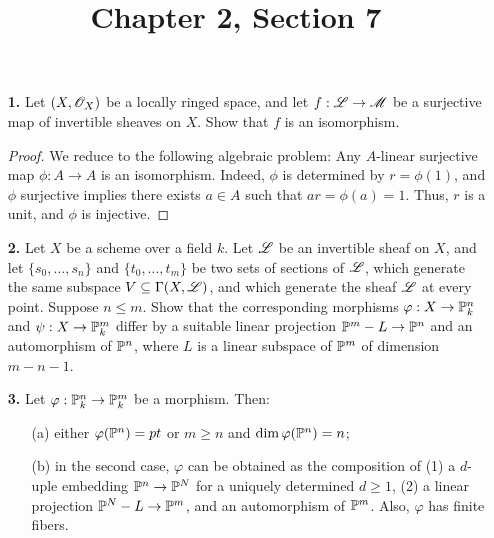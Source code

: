 \documentclass{article}
\title{Chapter 2, Section 7}
\begin{document}
\maketitle
\begin{enumerate} [label=\textbf{\arabic*.}, leftmargin=-0em]

\item[\textbf{1.}] Let $(X, \mathscr{O}_X)$ be a locally ringed space, and let $f : \mathscr{L} \to \mathscr{M}$ be a surjective map of invertible sheaves on $X$. Show that $f$ is an isomorphism.

\begin{proof}
    We reduce to the following algebraic problem: Any $A$-linear surjective map $\phi : A \to A$ is an isomorphism.
    Indeed, $\phi$ is determined by $r = \phi(1)$, and $\phi$ surjective implies there exists $a \in A$ such that $ar = \phi(a) = 1$. Thus, $r$ is a unit, and $\phi$ is injective.
\end{proof}

\item[\textbf{2.}] Let $X$ be a scheme over a field $k$. Let $\mathscr{L}$ be an invertible sheaf on $X$, and let $\{ s_0, \dots, s_n \}$ and $\{ t_0, \dots, t_m \}$ be two sets of sections of $\mathscr{L}$, which generate the same subspace $V \subseteq \Gamma(X, \mathscr{L})$, and which generate the sheaf $\mathscr{L}$ at every point. Suppose $n \leq m$. Show that the corresponding morphisms $\varphi : X \to \mathbb{P}_k^n$ and $\psi : X \to \mathbb{P}_k^m$ differ by a suitable linear projection $\mathbb{P}^m - L \to \mathbb{P}^n$ and an automorphism of $\mathbb{P}^n$, where $L$ is a linear subspace of $\mathbb{P}^m$ of dimension $m - n - 1$.

\item[\textbf{3.}] Let $\varphi : \mathbb{P}_k^n \to \mathbb{P}_k^m$ be a morphism. Then:
\begin{itemize}
    \item[(a)] either $\varphi(\mathbb{P}^n) = pt$ or $m \geq n$ and $\dim{\varphi(\mathbb{P}^n)} = n$;
    \item[(b)] in the second case, $\varphi$ can be obtained as the composition of (1) a $d$-uple embedding $\mathbb{P}^n \to \mathbb{P}^N$ for a uniquely determined $d \geq 1$, (2) a linear projection $\mathbb{P}^N - L \to \mathbb{P}^m$, and an automorphism of $\mathbb{P}^m$. Also, $\varphi$ has finite fibers.
\end{itemize}


\end{enumerate}
\end{document}
